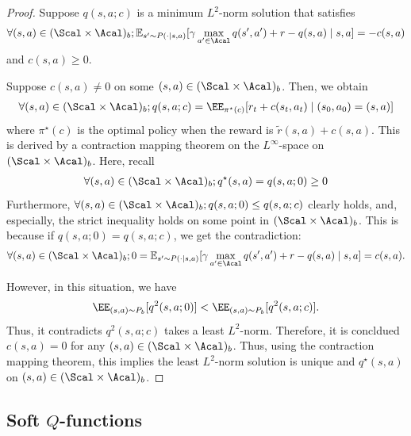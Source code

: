 \begin{proof}
Suppose $q(s,a;c)$ is a minimum $L^2$-norm solution that satisfies 
\begin{align*}
   \forall (s,a) \in (\Scal \times \Acal)_b; \mathbb{E}_{s'\sim P(\cdot \mid s,a)}[\gamma \max_{a'\in \Acal} q(s',a')+r-q(s,a)\mid s,a]=-c(s,a)
\end{align*}
 and $c(s,a)\geq 0$. 

 Suppose $c(s,a)\neq 0$ on some $(s,a) \in (\Scal \times \Acal)_b$. Then, we obtain 
 \begin{align*}
     \forall (s,a) \in (\Scal \times \Acal)_b;   q(s,a;c) =  \EE_{\pi^{\star}(c)}[r_t + c(s_t,a_t) \mid (s_0,a_0)=(s,a)]
 \end{align*}
 where $ \pi^{\star}(c)$ is the optimal policy when the reward is $\tilde r(s,a)+c(s,a)$. This is derived by a contraction mapping theorem on the $L^{\infty}$-space on $(\Scal \times \Acal)_b$.  Here, recall 
 \begin{align*}
    \forall (s,a) \in (\Scal \times \Acal)_b;  q^{\star}(s,a) = q(s,a;0)\geq 0 
 \end{align*}
Furthermore, $ \forall (s,a) \in (\Scal \times \Acal)_b;q(s,a;0)\leq q(s,a;c)$ clearly holds, and, especially, the strict inequality holds on some point in $(\Scal \times \Acal)_b$. This is because if $q(s,a;0)= q(s,a;c)$, we get the contradiction:
\begin{align*}
      \forall (s,a) \in (\Scal \times \Acal)_b; 0 = \mathbb{E}_{s'\sim P(\cdot \mid s,a)}[\gamma \max_{a'\in \Acal} q(s',a')+r-q(s,a)\mid s,a]=c(s,a). 
\end{align*}

However, in this situation, we have 
\begin{align*}
    \EE_{(s,a)\sim P_b}[q^2(s,a;0) ]<   \EE_{(s,a)\sim P_b}[q^2(s,a;c) ]. 
\end{align*}
Thus, it contradicts $q^2(s,a;c)$ takes a least $L^2$-norm. Therefore, it is concldued $c(s,a)=0$ for any $(s,a) \in (\Scal \times \Acal)_b$. Thus, using the contraction mapping theorem, this implies the least $L^2$-norm solution is unique and $q^{\star}(s,a)$ on $(s,a) \in (\Scal \times \Acal)_b$. 


 
\end{proof}




\subsection{Soft $Q$-functions }

